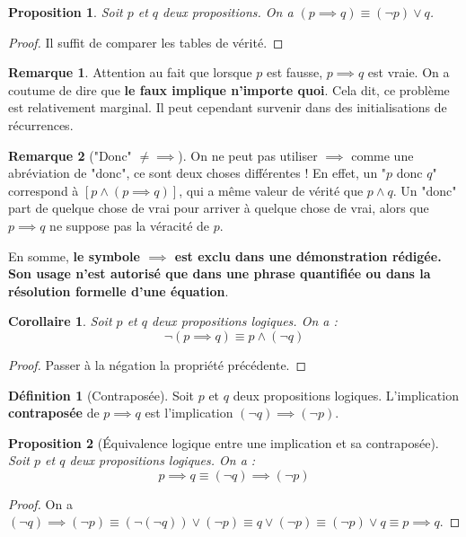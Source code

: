 \documentclass[french]{book}
\theoremstyle{plain}
\newtheorem{prop}{Proposition}[chapter]
\newtheorem{cor}{Corollaire}[chapter]
\theoremstyle{definition}
\newtheorem{dfn}{Définition}[chapter]
\newtheorem{rmq}{Remarque}[chapter]
\theoremstyle{remark}
\begin{document}
\begin{prop}
	Soit $p$ et $q$ deux propositions. On a $(p\implies q)\equiv (\lnot p)\lor q$.
\end{prop}
\begin{proof}
	Il suffit de comparer les tables de vérité.
\end{proof}
\begin{rmq}
	Attention au fait que lorsque $p$ est fausse, $p\implies q$ est vraie. On a coutume de dire que \textbf{le faux implique n'importe quoi}. Cela dit, ce problème est relativement marginal. Il peut cependant survenir dans des initialisations de récurrences.
\end{rmq}
\begin{rmq}["Donc" $\ne \implies$]
	On ne peut pas utiliser $\implies$ comme une abréviation de "donc", ce sont deux choses différentes ! En effet, un "$p$ donc $q$" correspond à $\left[p\land \left(p \implies q\right)\right] $, qui a même valeur de vérité que $p\land q$. Un "donc" part de quelque chose de vrai pour arriver à quelque chose de vrai, alors que $p\implies q$ ne suppose pas la véracité de $p$. \par En somme, \textbf{le symbole $\implies$ est exclu dans une démonstration rédigée. Son usage n'est autorisé que dans une phrase quantifiée ou dans la résolution formelle d'une équation}.
\end{rmq}
\begin{cor}
	Soit $p$ et $q$ deux propositions logiques. On a : $$\lnot(p\implies q)\equiv p\land (\lnot q)$$
\end{cor}
\begin{proof}
	Passer à la négation la propriété précédente.
\end{proof}
\begin{dfn}[Contraposée]
	Soit $p$ et $q$ deux propositions logiques. L'implication \textbf{contraposée} de $p\implies q$ est l'implication $(\lnot q)\implies (\lnot p)$. 
\end{dfn}
\begin{prop}[Équivalence logique entre une implication et sa contraposée]
	Soit $p$ et $q$ deux propositions logiques. On a : $$p\implies q\equiv (\lnot q)\implies (\lnot p)$$
\end{prop}
\begin{proof}
	On a $(\lnot q)\implies (\lnot p)\equiv (\lnot(\lnot q))\lor (\lnot p)\equiv q\lor (\lnot p)\equiv (\lnot p)\lor q\equiv p\implies q$.
\end{proof}
\end{document}
